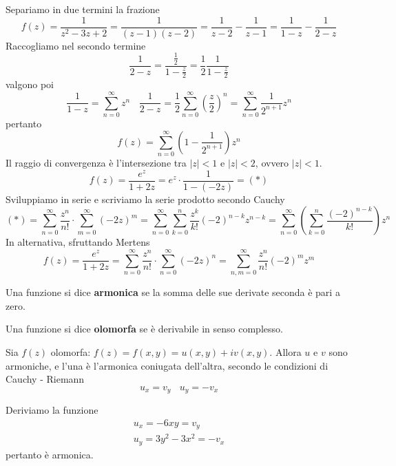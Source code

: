 Separiamo in due termini la frazione
\begin{equation*}
f(z) = \frac{1}{z^{2} - 3z + 2} = \frac{1}{(z - 1)(z - 2)} = \frac{1}{z - 2} - \frac{1}{z - 1} = \frac{1}{1 - z} - \frac{1}{2 - z}
\end{equation*}
Raccogliamo nel secondo termine
\begin{equation*}
\frac{1}{2 - z} = \frac{\frac{1}{2}}{1 - \frac{z}{2}} = \frac{1}{2}\frac{1}{1 - \frac{z}{2}}
\end{equation*}
valgono poi
\begin{equation*}
\frac{1}{1 - z} = \sum ^{\infty }_{n = 0} z^{n} \ \ \ \ \frac{1}{2 - z} = \frac{1}{2}\sum ^{\infty }_{n = 0}\left(\frac{z}{2}\right)^{n} = \sum ^{\infty }_{n = 0}\frac{1}{2^{n + 1}} z^{n}
\end{equation*}
pertanto
\begin{equation*}
f(z) = \sum ^{\infty }_{n = 0}\left(1 - \frac{1}{2^{n + 1}}\right) z^{n}
\end{equation*}
Il raggio di convergenza è l'intersezione tra $|z| < 1$ e $|z| < 2$, ovvero $|z| < 1$.
\Soluzione
\begin{equation*}
f(z) = \frac{e^{z}}{1 + 2z} = e^{z} \cdot \frac{1}{1 - (- 2z)} = (*)
\end{equation*}
Sviluppiamo in serie e scriviamo la serie prodotto secondo Cauchy
\begin{equation*}
(*) = \sum ^{\infty }_{n = 0}\frac{z^{n}}{n!} \cdot \sum ^{\infty }_{m = 0} (- 2z)^{m} = \sum ^{\infty }_{n = 0}\sum ^{n}_{k = 0}\frac{z^{k}}{k!} (- 2)^{n - k} z^{n - k} = \sum ^{\infty }_{n = 0}\left(\sum ^{n}_{k = 0}\frac{(- 2)^{n - k}}{k!}\right) z^{n}
\end{equation*}
In alternativa, sfruttando Mertens
\begin{equation*}
f(z) = \frac{e^{z}}{1 + 2z} = \sum ^{\infty }_{n = 0}\frac{z^{n}}{n!} \cdot \sum ^{\infty }_{n = 0} (- 2z)^{n} = \sum ^{\infty }_{n,m = 0}\frac{z^{n}}{n!} (- 2)^{m} z^{m}
\end{equation*}
\Soluzione
\begin{defn}
Una funzione si dice \textbf{armonica} se la somma delle sue derivate seconda è pari a zero.
\end{defn}
\begin{defn}
Una funzione si dice \textbf{olomorfa} se è derivabile in senso complesso.
\end{defn}
\begin{thm}
Sia $f(z)$ olomorfa: $f(z) = f(x,y) = u(x,y) + iv(x,y)$. Allora $u$ e $v$ sono armoniche, e l'una è l'armonica coniugata dell'altra, secondo le condizioni di Cauchy - Riemann
\begin{equation*}
u_{x} = v_{y} \ \ \ \ u_{y} = - v_{x}
\end{equation*}
\end{thm}
Deriviamo la funzione
\begin{gather*}
u_{x} = - 6xy = v_{y}\\
u_{y} = 3y^{2} - 3x^{2} = - v_{x}
\end{gather*}
pertanto è armonica.

